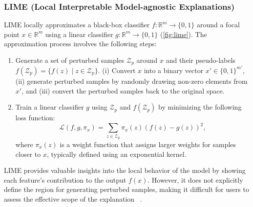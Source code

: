 \documentclass[runningheads]{llncs}
\begin{document}
{\subsubsection[LIME]{%
  LIME (Local Interpretable Model-agnostic Explanations)~\cite{ribeiro2016why}
}
LIME locally
approximates a black-box classifier $f: \mathbb{R}^m \to \{0,1\}$
around a focal point $x \in \mathbb{R}^m$
using a linear classifier $g: \mathbb{R}^m \to \{0,1\}$
(\cref{fig:lime}).
The approximation process involves the following steps:
\begin{enumerate}
  \item Generate a set of perturbed samples $\mathcal{Z}_p$ around $x$
        and their pseudo-labels $f(\mathcal{Z}_p) = \{f(z) \mid z \in \mathcal{Z}_p\}$.
        (i) Convert $x$ into a binary vector $x'\in{\{0,1\}}^{m'}$,
        (ii) generate perturbed samples by randomly drawing non-zero elements
        from $x'$,
        and (iii) convert the perturbed samples back to the original space.
  \item Train a linear classifier $g$
        using $\mathcal{Z}_p$ and $f(\mathcal{Z}_p)$
        by minimizing the following loss function:
        \begin{equation}
          \mathcal{L}(f,g,\pi_x)=\sum_{z\in\mathcal{Z}_p}
          \pi_x(z){\left(f(z)-g(z)\right)}^2,
        \end{equation}
        where $\pi_x(z)$ is a weight function that assigns larger weights
        for samples closer to $x$, typically defined using an exponential kernel.
\end{enumerate}
LIME provides valuable insights into the local behavior of the model
by showing each feature's contribution to the output $f(x)$.
However, it does not explicitly define the region for generating perturbed samples,
making it difficult for users to assess the effective scope of the explanation
~\cite{ribeiro2018anchors}.

}
\end{document}
